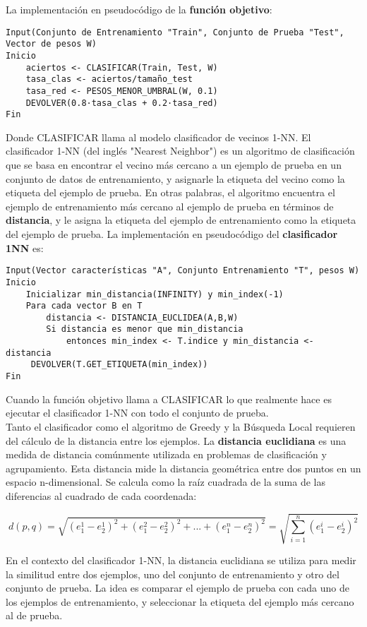 La implementación en pseudocódigo de la \textbf{función objetivo}:

\begin{verbatim}
Input(Conjunto de Entrenamiento "Train", Conjunto de Prueba "Test", Vector de pesos W)
Inicio
    aciertos <- CLASIFICAR(Train, Test, W)
    tasa_clas <- aciertos/tamaño_test
    tasa_red <- PESOS_MENOR_UMBRAL(W, 0.1)
    DEVOLVER(0.8·tasa_clas + 0.2·tasa_red)
Fin
\end{verbatim}

Donde CLASIFICAR llama al modelo clasificador de vecinos 1-NN. El clasificador 1-NN (del inglés "Nearest Neighbor") es un algoritmo de clasificación que se basa en encontrar el vecino más cercano a un ejemplo de prueba en un conjunto de datos de entrenamiento, y asignarle la etiqueta del vecino como la etiqueta del ejemplo de prueba. En otras palabras, el algoritmo encuentra el ejemplo de entrenamiento más cercano al ejemplo de prueba en términos de \textbf{distancia}, y le asigna la etiqueta del ejemplo de entrenamiento como la etiqueta del ejemplo de prueba. La implementación en pseudocódigo del \textbf{clasificador 1NN} es:

\begin{verbatim}
Input(Vector características "A", Conjunto Entrenamiento "T", pesos W)
Inicio
    Inicializar min_distancia(INFINITY) y min_index(-1)
    Para cada vector B en T
        distancia <- DISTANCIA_EUCLIDEA(A,B,W)
        Si distancia es menor que min_distancia
            entonces min_index <- T.indice y min_distancia <- distancia
     DEVOLVER(T.GET_ETIQUETA(min_index))
Fin
\end{verbatim}

Cuando la función objetivo llama a CLASIFICAR lo que realmente hace es ejecutar el clasificador 1-NN con todo el conjunto de prueba. \\

Tanto el clasificador como el algoritmo de Greedy y la Búsqueda Local requieren del cálculo de la distancia entre los ejemplos. La \textbf{distancia euclidiana} es una medida de distancia comúnmente utilizada en problemas de clasificación y agrupamiento. Esta distancia mide la distancia geométrica entre dos puntos en un espacio n-dimensional. Se calcula como la raíz cuadrada de la suma de las diferencias al cuadrado de cada coordenada:

\[d(p,q) = \sqrt{(e^1_1 - e^1_2)^2 + (e^2_1 - e^2_2)^2 + ... + (e^n_1 - e^n_2)^2} =  \sqrt{\sum_{i=1}^n (e^i_1 - e^i_2)^2}\]

En el contexto del clasificador 1-NN, la distancia euclidiana se utiliza para medir la similitud entre dos ejemplos, uno del conjunto de entrenamiento y otro del conjunto de prueba. La idea es comparar el ejemplo de prueba con cada uno de los ejemplos de entrenamiento, y seleccionar la etiqueta del ejemplo más cercano al de prueba.\\

